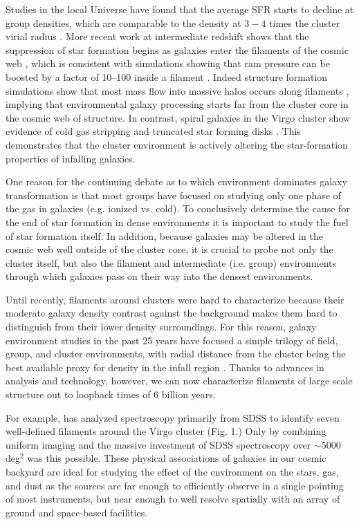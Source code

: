 \documentclass[11pt]{article}
\begin{document}
Studies in the local Universe have found
that the average SFR starts to decline at group densities, which are
comparable to the density at $3-4$ times the cluster virial radius
\citep{Lewis02,Gomez03}.  More recent work at intermediate redshift shows that the suppression of star formation begins as galaxies enter the filaments of the cosmic web \citep{Laigle17, Rerat17}, which is consistent with simulations showing that ram pressure can be boosted by a factor of 10--100 inside a filament \citep{Bahe13}.  Indeed structure formation simulations show that most mass flow into massive halos occurs along filaments \citep{Ramachandra15}, implying that environmental galaxy processing starts far from the cluster core in the cosmic web of structure.    In contrast, spiral galaxies
in the Virgo cluster show evidence of cold gas stripping and truncated
star forming disks
\citep{Koopmann98,Koopmann04,Dale01,Crowl05,Chung07}.  This
demonstrates that the cluster environment is actively altering the
star-formation properties of infalling galaxies.  

One reason for the continuing debate as to which environment dominates galaxy transformation is that most groups have
focused on studying only one phase of the gas in galaxies
(e.g. ionized vs. cold).  To conclusively determine the cause for the
end of star formation in dense environments it is important to study
the fuel of star formation itself.  In addition, because galaxies may
be altered in the cosmic web well outside of the cluster core, it is crucial to probe not only the cluster itself, but also the filament and intermediate (i.e. group) environments through which galaxies pass on
their way into the densest environments.

  Until recently, filaments around clusters were hard to characterize because their moderate galaxy density contrast against the background makes them hard to distinguish from their lower density surroundings.  For this reason, galaxy environment studies in the past 25 years have focused a simple trilogy of field, group, and cluster environments, with radial distance from the cluster being the best available proxy for density in the infall region \citep[e.g.][]{Lewis02,Patel09}.  Thanks to advances in analysis and technology, however, we can now characterize filaments of large scale structure out to loopback times of 6 billion years.   

For example, \citet{Kim16} has analyzed spectroscopy primarily from SDSS to identify seven well-defined filaments around the Virgo cluster (Fig. 1.)  Only by combining uniform imaging and the massive investment of SDSS spectroscopy over $\sim 5000$deg$^2$  was this possible.  These physical associations of galaxies in our cosmic backyard are ideal for studying the effect of the environment on the stars, gas, and dust as the sources are far enough to efficiently observe in a single pointing of most instruments, but near enough to well resolve spatially with an array of ground and space-based facilities.
\end{document}
